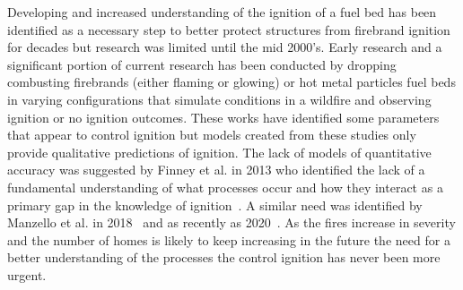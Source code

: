     Developing and increased understanding of the ignition of a fuel bed has been identified as a necessary step to better protect structures from firebrand ignition for decades but research was limited until the mid 2000's. Early research and a significant portion of current research has been conducted by dropping combusting firebrands (either flaming or glowing) or hot metal particles fuel beds in varying configurations that simulate conditions in a wildfire and observing ignition or no ignition outcomes. These works have identified some parameters that appear to control ignition but models created from these studies only provide qualitative predictions of ignition. The lack of models of quantitative accuracy was suggested by Finney et al. in 2013 who identified the lack of a fundamental understanding of what processes occur and how they interact as a primary gap in the knowledge of ignition~\cite{Finney2013}. A similar need was identified by Manzello et al. in 2018~\cite{Manzello2018} and as recently as 2020~\cite{Manzello2020}. As the fires increase in severity and the number of homes is likely to keep increasing in the future the need for a better understanding of the processes the control ignition has never been more urgent.
    
